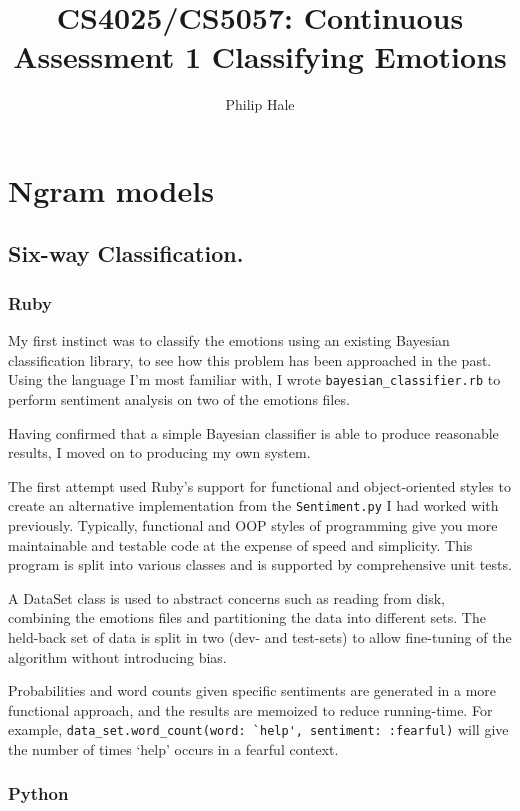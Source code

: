 \documentclass[a4paper,oneside]{article}
\author{Philip Hale}
\title{CS4025/CS5057: Continuous Assessment 1 Classifying Emotions}
\begin{document}
\maketitle

\section{Ngram models}

\subsection{Six-way Classification.}

\subsubsection{Ruby}

My first instinct was to classify the emotions using an existing Bayesian
classification library, to see how this problem has been approached in the
past.  Using the language I'm most familiar with, I wrote
\verb!bayesian_classifier.rb!  to perform sentiment analysis on two of the
emotions files.

Having confirmed that a simple Bayesian classifier is able to produce
reasonable results, I moved on to producing my own system.

The first attempt used Ruby's support for functional and object-oriented styles
to create an alternative implementation from the \verb!Sentiment.py! I had worked
with previously.  Typically, functional and OOP styles of programming give you
more maintainable and testable code at the expense of speed and simplicity.
This program is split into various classes and is supported by comprehensive
unit tests.

A DataSet class is used to abstract concerns such as reading from disk,
combining the emotions files and partitioning the data into different sets. The
held-back set of data is split in two (dev- and test-sets) to allow fine-tuning
of the algorithm without introducing bias.

Probabilities and word counts given specific sentiments are generated
in a more functional approach, and the results are memoized to reduce
running-time.  For example,
\verb!data_set.word_count(word: `help', sentiment: :fearful)! will give the
number of times `help' occurs in a fearful context.

\subsubsection{Python}
\end{document}
